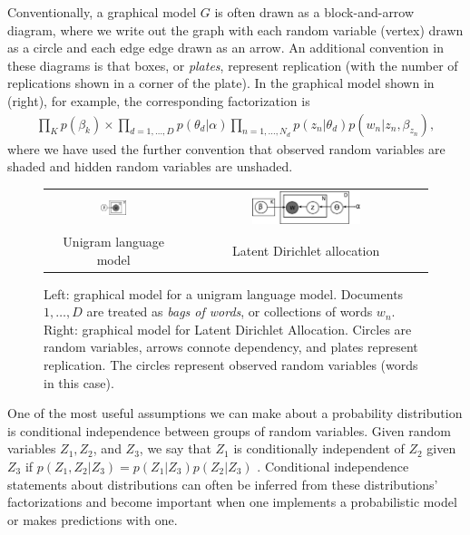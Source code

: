 Conventionally, a graphical model $G$ is often drawn as a
block-and-arrow diagram, where we write out the graph with each random
variable (vertex) drawn as a circle and each edge edge drawn as an
arrow.  An additional convention in these diagrams is that boxes, or
\emph{plates}, represent replication (with the number of replications
shown in a corner of the plate). In the graphical model shown in
 (right), for example, the corresponding
factorization is
\begin{align}
  \prod_K p(\beta_k) \times \prod_{d=1,\ldots,D} p(\theta_d | \alpha) \prod_{n=1,\ldots,N_d} p(z_n | \theta_d) p(w_n | z_n, \beta_{z_n}),
\end{align}
where we have used the further convention that observed random
variables are shaded and hidden random variables are unshaded.

\begin{figure}
  \begin{center}
    \begin{tabular}{cc}
      \includegraphics[width=0.2\textwidth]{chapter_introductory_material/figs/bagofwords_gm.pdf} & 
      \includegraphics[width=0.4667\textwidth]{chapter_introductory_material/figs/lda_gm.pdf} \\
      Unigram language model & Latent Dirichlet allocation \\
    \end{tabular}
  \end{center}
  \caption{Left: graphical model for a unigram language model.
    Documents $1, \ldots, D$ are treated as \emph{bags of words}, or
    collections of words $w_n$.  Right: graphical model for Latent
    Dirichlet Allocation.  Circles are random variables, arrows
    connote dependency, and plates represent replication.  The circles
    represent observed random variables (words in this case).}
  \label{fig:bagofwords_lda_gm}
\end{figure}

One of the most useful assumptions we can make about a probability
distribution is conditional independence between groups of random
variables.  Given random variables $Z_1, Z_2$, and $Z_3$, we say that
$Z_1$ is conditionally independent of $Z_2$ given $Z_3$ if $p(Z_1, Z_2
| Z_3) = p(Z_1 | Z_3) p(Z_2 | Z_3)$ \citep{bishop:2006}.  Conditional
independence statements about distributions can often be inferred from
these distributions' factorizations \citep{bishop:2006} and become
important when one implements a probabilistic model or makes
predictions with one.

